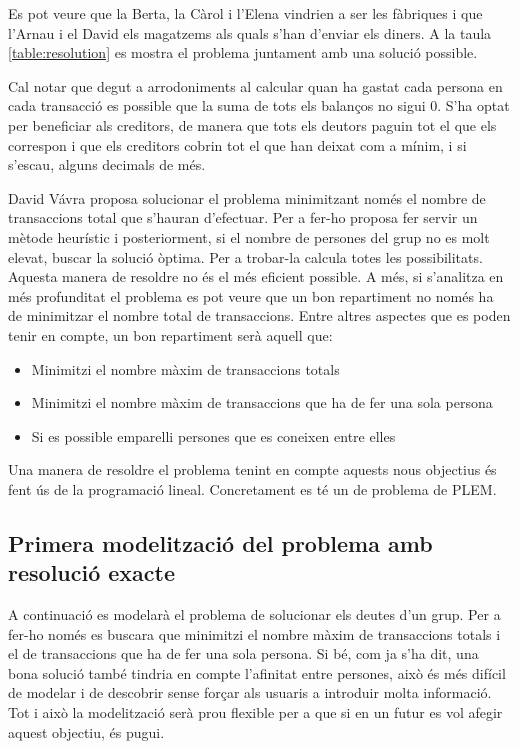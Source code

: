 Es pot veure que la Berta, la Càrol i l'Elena vindrien a ser les fàbriques i que l'Arnau i el David els magatzems als quals s'han d'enviar els diners. A la taula \ref{table:resolution} es mostra el problema juntament amb una solució possible.

Cal notar que degut a arrodoniments al calcular quan ha gastat cada persona en cada transacció es possible que la suma de tots els balanços no sigui 0. S'ha optat per beneficiar als creditors, de manera que tots els deutors paguin tot el que els correspon i que els creditors cobrin tot el que han deixat com a mínim, i si s'escau, alguns decimals de més.

David Vávra proposa solucionar el problema minimitzant només el nombre de transaccions total que s'hauran d'efectuar. Per a fer-ho proposa fer servir un mètode heurístic i posteriorment, si el nombre de persones del grup no es molt elevat, buscar la solució òptima. Per a trobar-la calcula totes les possibilitats. Aquesta manera de resoldre no és el més eficient possible. A més, si s'analitza en més profunditat el problema es pot veure que un bon repartiment no només ha de minimitzar el nombre total de transaccions. Entre altres aspectes que es poden tenir en compte, un bon repartiment serà aquell que:

\begin{itemize}
\item Minimitzi el nombre màxim de transaccions totals
\item Minimitzi el nombre màxim de transaccions que ha de fer una sola persona
\item Si es possible emparelli persones que es coneixen entre elles
\end{itemize}

Una manera de resoldre el problema tenint en compte aquests nous objectius és fent ús de la programació lineal. Concretament es té un de problema de \ac{PLEM}.

\subsection{Primera modelització del problema amb resolució exacte}
A continuació es modelarà el problema de solucionar els deutes d'un grup. Per a fer-ho només es buscara que minimitzi el nombre màxim de transaccions totals i el de transaccions que ha de fer una sola persona. Si bé, com ja s'ha dit, una bona solució també tindria en compte l'afinitat entre persones, això és més difícil de modelar i de descobrir sense forçar als usuaris a introduir molta informació. Tot i això la modelització serà prou flexible per a que si en un futur es vol afegir aquest objectiu, és pugui. 
